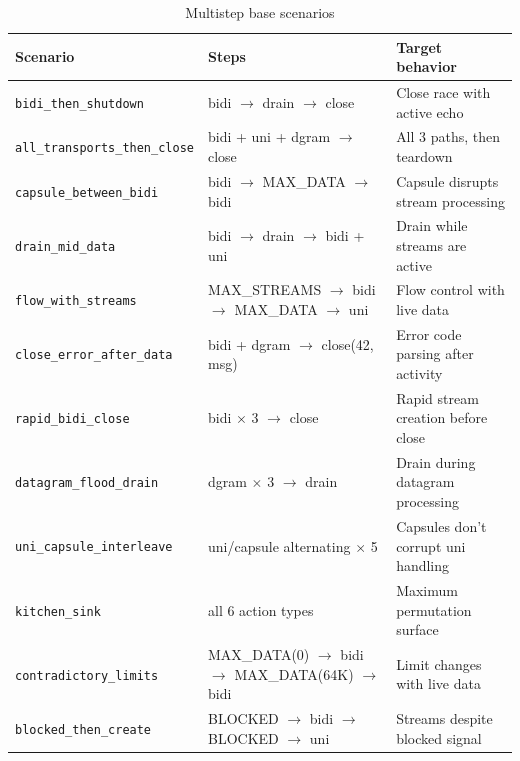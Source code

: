 \begin{table}[ht]
\centering
\caption{Multistep base scenarios}
\label{tab:scenarios}
\small
\begin{tabular}{lp{4.8cm}p{4.5cm}}
\hline
\textbf{Scenario} & \textbf{Steps} & \textbf{Target behavior} \\
\hline
\texttt{bidi\_then\_shutdown} & bidi $\to$ drain $\to$ close & Close race with active echo \\
\texttt{all\_transports\_then\_close} & bidi + uni + dgram $\to$ close & All 3 paths, then teardown \\
\texttt{capsule\_between\_bidi} & bidi $\to$ MAX\_DATA $\to$ bidi & Capsule disrupts stream processing \\
\texttt{drain\_mid\_data} & bidi $\to$ drain $\to$ bidi + uni & Drain while streams are active \\
\texttt{flow\_with\_streams} & MAX\_STREAMS $\to$ bidi $\to$ MAX\_DATA $\to$ uni & Flow control with live data \\
\texttt{close\_error\_after\_data} & bidi + dgram $\to$ close(42, msg) & Error code parsing after activity \\
\texttt{rapid\_bidi\_close} & bidi $\times$ 3 $\to$ close & Rapid stream creation before close \\
\texttt{datagram\_flood\_drain} & dgram $\times$ 3 $\to$ drain & Drain during datagram processing \\
\texttt{uni\_capsule\_interleave} & uni/capsule alternating $\times$ 5 & Capsules don't corrupt uni handling \\
\texttt{kitchen\_sink} & all 6 action types & Maximum permutation surface \\
\texttt{contradictory\_limits} & MAX\_DATA(0) $\to$ bidi $\to$ MAX\_DATA(64K) $\to$ bidi & Limit changes with live data \\
\texttt{blocked\_then\_create} & BLOCKED $\to$ bidi $\to$ BLOCKED $\to$ uni & Streams despite blocked signal \\
\hline
\end{tabular}
\end{table}
